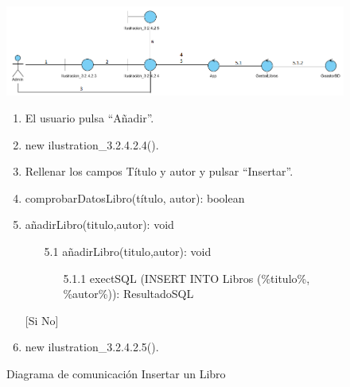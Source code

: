 ﻿\documentclass{report}
\begin{document}
                    \begin{figure}[H]
                \centering
                \includegraphics[width=1.1\textwidth]{img/comunicacion/Diagrama4.png}
                \caption{Diagrama de comunicación Insertar un Libro}
            \clearpage
            \begin{enumerate}
                \item El usuario pulsa ``Añadir''.
                \item new ilustration\_3.2.4.2.4().
                \item Rellenar los campos Título y autor y pulsar ``Insertar''.
                \item comprobarDatosLibro(título, autor): boolean 
                \newline
                [Si comprobarDatosLibro == TRUE]
                \item  añadirLibro(titulo,autor): void
                \begin{enumerate}
                    \item[5.1]  añadirLibro(titulo,autor): void
                        \begin{enumerate}
                            \item[5.1.1] exectSQL (INSERT INTO Libros (\%titulo\%, \%autor\%)): ResultadoSQL
                        \end{enumerate}
                    \end{enumerate}
                    [Si No]
                \item new ilustration\_3.2.4.2.5().
            \end{enumerate}
            \end{figure}
\end{document}
